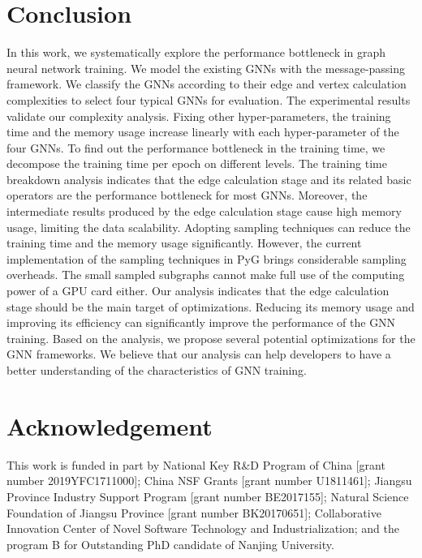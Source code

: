 \section{Conclusion}
\label{sec:conclusion}

In this work, we systematically explore the performance bottleneck in graph neural network training. 
We model the existing GNNs with the message-passing framework. 
We classify the GNNs according to their edge and vertex calculation complexities to select four typical GNNs for evaluation. 
The experimental results validate our complexity analysis. Fixing other hyper-parameters, the training time and the memory usage increase linearly with each hyper-parameter of the four GNNs. 
To find out the performance bottleneck in the training time, we decompose the training time per epoch on different levels. 
The training time breakdown analysis indicates that the edge calculation stage and its related basic operators are the performance bottleneck for most GNNs. 
Moreover, the intermediate results produced by the edge calculation stage cause high memory usage, limiting the data scalability. 
Adopting sampling techniques can reduce the training time and the memory usage significantly. 
However, the current implementation of the sampling techniques in PyG brings considerable sampling overheads. 
The small sampled subgraphs cannot make full use of the computing power of a GPU card either. 
Our analysis indicates that the edge calculation stage should be the main target of optimizations. 
Reducing its memory usage and improving its efficiency can significantly improve the performance of the GNN training. 
Based on the analysis, we propose several potential optimizations for the GNN frameworks. 
We believe that our analysis can help developers to have a better understanding of the characteristics of GNN training.

\section*{Acknowledgement}

This work is funded in part by National Key R\&D Program of China [grant number 2019YFC1711000]; China NSF Grants [grant number U1811461]; Jiangsu Province Industry Support Program [grant number BE2017155]; Natural Science Foundation of Jiangsu Province [grant number BK20170651]; Collaborative Innovation Center of Novel Software Technology and Industrialization; and the program B for Outstanding PhD candidate of Nanjing University.
